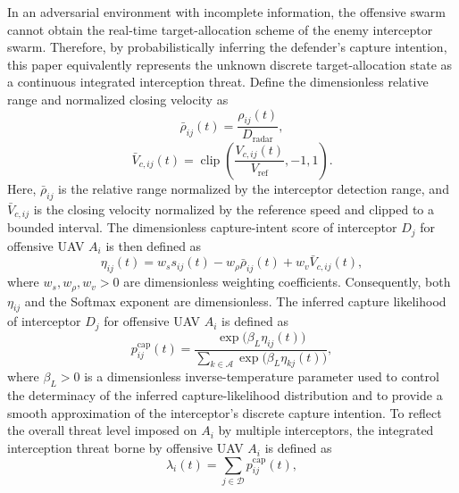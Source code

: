 \documentclass{cja}
\begin{document}
In an adversarial environment with incomplete information, the offensive swarm cannot obtain the real-time target-allocation scheme of the enemy interceptor swarm.
Therefore, by probabilistically inferring the defender's capture intention, this paper equivalently represents the unknown discrete target-allocation state as a continuous integrated interception threat. Define the dimensionless relative range and normalized closing velocity as
\begin{equation}
\bar\rho_{ij}(t)
=
\frac{\rho_{ij}(t)}{D_{\mathrm{radar}}},
\end{equation}
\begin{equation}
\bar V_{c,ij}(t)
=
\operatorname{clip}\!\left(
\frac{V_{c,ij}(t)}{V_{\mathrm{ref}}},
-1,1
\right).
\end{equation}
Here, $\bar\rho_{ij}$ is the relative range normalized by the interceptor detection range, and $\bar V_{c,ij}$ is the closing velocity normalized by the reference speed and clipped to a bounded interval. The dimensionless capture-intent score of interceptor $D_j$ for offensive UAV $A_i$ is then defined as
\begin{equation}
\eta_{ij}(t)
=
w_s s_{ij}(t)
-
w_{\rho}\bar\rho_{ij}(t)
+
w_v \bar V_{c,ij}(t),
\end{equation}
where $w_s,w_{\rho},w_v>0$ are dimensionless weighting coefficients. Consequently, both $\eta_{ij}$ and the Softmax exponent are dimensionless. The inferred capture likelihood of interceptor $D_j$ for offensive UAV $A_i$ is defined as
\begin{equation}
p_{ij}^{\mathrm{cap}}(t)
=
\frac{\exp\!\bigl(\beta_L \eta_{ij}(t)\bigr)}
{\sum\limits_{k\in\mathcal{A}}\exp\!\bigl(\beta_L \eta_{kj}(t)\bigr)},
\label{eq:soft-lock-prob}
\end{equation}
where $\beta_L>0$ is a dimensionless inverse-temperature parameter used to control the determinacy of the inferred capture-likelihood distribution and to provide a smooth approximation of the interceptor's discrete capture intention.
To reflect the overall threat level imposed on $A_i$ by multiple interceptors, the integrated interception threat borne by offensive UAV $A_i$ is defined as
\begin{equation}
\lambda_i(t)
=
\sum_{j\in\mathcal D}p_{ij}^{\mathrm{cap}}(t),
\label{eq:soft-lock-pressure}
\end{equation}
\end{document}
